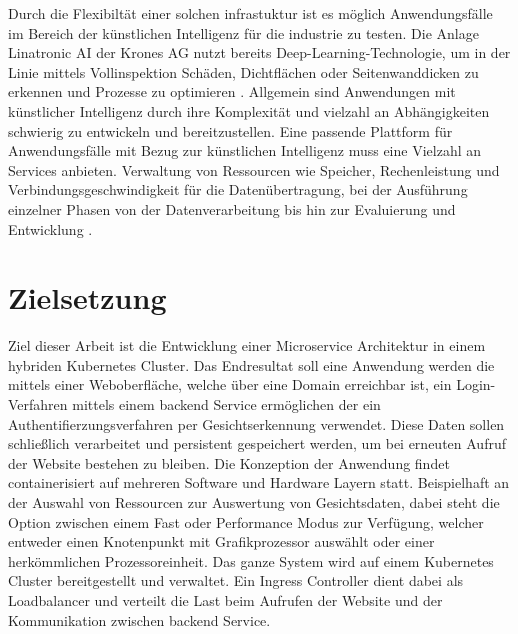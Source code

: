 Durch die Flexibiltät einer solchen infrastuktur ist es möglich Anwendungsfälle im Bereich
der künstlichen Intelligenz
für die industrie zu testen. Die Anlage Linatronic AI der Krones AG nutzt bereits Deep-Learning-Technologie,
um in der Linie mittels Vollinspektion Schäden, Dichtflächen oder Seitenwanddicken
zu erkennen und Prozesse zu optimieren \cite{linatronic}. Allgemein sind Anwendungen mit künstlicher Intelligenz durch ihre Komplexität
und vielzahl an Abhängigkeiten schwierig zu entwickeln und bereitzustellen. 
Eine passende Plattform für Anwendungsfälle mit Bezug zur künstlichen Intelligenz
muss eine Vielzahl an Services anbieten. Verwaltung von Ressourcen wie Speicher,
Rechenleistung und Verbindungsgeschwindigkeit für die Datenübertragung, 
bei der Ausführung einzelner Phasen von der Datenverarbeitung bis hin zur Evaluierung und Entwicklung
\cite{mlops}. 

\section{Zielsetzung}
Ziel dieser Arbeit ist die Entwicklung einer Microservice
Architektur in einem hybriden Kubernetes Cluster. Das Endresultat
soll eine Anwendung werden die mittels einer Weboberfläche, welche über eine Domain erreichbar ist,
ein Login-Verfahren mittels einem backend Service ermöglichen der ein Authentifierzungsverfahren
per Gesichtserkennung verwendet. 
Diese Daten sollen schließlich verarbeitet und persistent 
gespeichert werden, um bei erneuten Aufruf der Website bestehen zu bleiben.
Die Konzeption der Anwendung findet containerisiert auf mehreren Software und Hardware Layern
statt. Beispielhaft an der Auswahl von Ressourcen zur Auswertung von Gesichtsdaten, dabei
steht die Option zwischen einem \glqq Fast\grqq{} oder \glqq Performance\grqq{} Modus zur Verfügung,
welcher entweder einen Knotenpunkt mit Grafikprozessor auswählt oder einer herkömmlichen Prozessoreinheit.
Das ganze System wird auf einem Kubernetes Cluster bereitgestellt und verwaltet.
Ein Ingress Controller dient dabei als Loadbalancer und verteilt die Last beim 
Aufrufen der Website und der Kommunikation zwischen backend Service.

